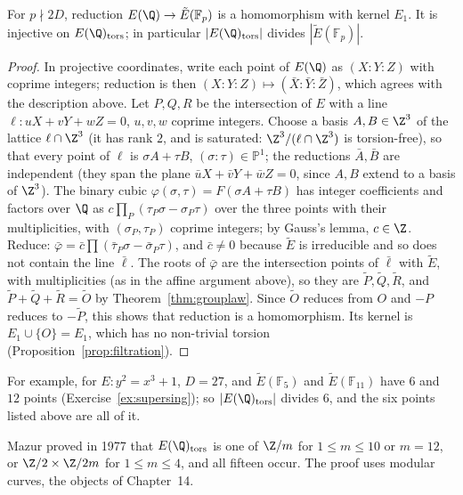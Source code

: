 \begin{proposition}\label{prop:reduction}
For $p\nmid2D$, reduction $E(\Q)\to\tilde E(\mathbb F_p)$ is a homomorphism with kernel $E_1$. It is injective on $E(\Q)_{\mathrm{tors}}$; in particular
$|E(\Q)_{\mathrm{tors}}|$ divides $|\tilde E(\mathbb F_p)|$.
\end{proposition}
\begin{proof}
In projective coordinates, write each point of $E(\Q)$ as $(X:Y:Z)$ with coprime integers; reduction is then $(X:Y:Z)\mapsto(\bar X:\bar Y:\bar Z)$, which
agrees with the description above. Let $P,Q,R$ be the intersection of $E$ with a line $\ell:uX+vY+wZ=0$, $u,v,w$ coprime integers. Choose a basis
$A,B\in\Z^3$ of the lattice $\ell\cap\Z^3$ (it has rank $2$, and is saturated: $\Z^3/(\ell\cap\Z^3)$ is torsion-free), so that every point of $\ell$ is
$\sigma A+\tau B$, $(\sigma:\tau)\in\mathbb P^1$; the reductions $\bar A,\bar B$ are independent (they span the plane $\bar u X+\bar vY+\bar wZ=0$, since $A,B$
extend to a basis of $\Z^3$). The binary cubic $\varphi(\sigma,\tau)=F(\sigma A+\tau B)$ has integer coefficients and factors over $\Q$ as
$c\prod_{P}(\tau_P\sigma-\sigma_P\tau)$ over the three points with their multiplicities, with $(\sigma_P,\tau_P)$ coprime integers; by Gauss's lemma, $c\in\Z$.
Reduce: $\bar\varphi=\bar c\prod(\bar\tau_P\sigma-\bar\sigma_P\tau)$, and $\bar c\ne0$ because $\tilde E$ is irreducible and so does not contain the line
$\bar\ell$. The roots of $\bar\varphi$ are the intersection points of $\bar\ell$ with $\tilde E$, with multiplicities (as in the affine argument above), so they are
$\tilde P,\tilde Q,\tilde R$, and $\tilde P+\tilde Q+\tilde R=\tilde O$ by Theorem~\ref{thm:grouplaw}. Since $\tilde O$ reduces from $O$ and $-P$ reduces
to $-\tilde P$, this shows that reduction is a homomorphism. Its kernel is $E_1\cup\{O\}=E_1$, which has no non-trivial torsion
(Proposition~\ref{prop:filtration}).
\end{proof}

For example, for $E:y^2=x^3+1$, $D=27$, and $\tilde E(\mathbb F_5)$ and $\tilde E(\mathbb F_{11})$ have $6$ and $12$ points (Exercise~\ref{ex:supersing}); so
$|E(\Q)_{\mathrm{tors}}|$ divides $6$, and the six points listed above are all of it.

\begin{remark}
Mazur proved in 1977 that $E(\Q)_{\mathrm{tors}}$ is one of $\Z/m$ for $1\le m\le10$ or $m=12$, or $\Z/2\times\Z/2m$ for $1\le m\le4$, and all fifteen occur.
The proof uses modular curves, the objects of Chapter~14.
\end{remark}

